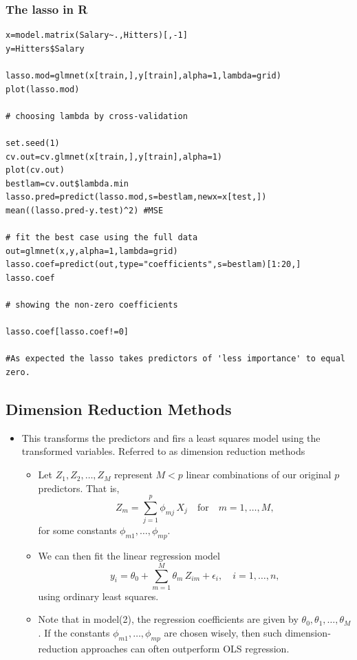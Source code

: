 \documentclass{article}
\begin{document}
\subsubsection{The lasso in R}
\begin{lstlisting}
x=model.matrix(Salary~.,Hitters)[,-1]
y=Hitters$Salary

lasso.mod=glmnet(x[train,],y[train],alpha=1,lambda=grid)
plot(lasso.mod)

# choosing lambda by cross-validation

set.seed(1)
cv.out=cv.glmnet(x[train,],y[train],alpha=1)
plot(cv.out)
bestlam=cv.out$lambda.min
lasso.pred=predict(lasso.mod,s=bestlam,newx=x[test,])
mean((lasso.pred-y.test)^2) #MSE

# fit the best case using the full data
out=glmnet(x,y,alpha=1,lambda=grid)
lasso.coef=predict(out,type="coefficients",s=bestlam)[1:20,]
lasso.coef

# showing the non-zero coefficients

lasso.coef[lasso.coef!=0]

#As expected the lasso takes predictors of 'less importance' to equal zero.
\end{lstlisting}


\subsection{Dimension Reduction Methods}
\begin{itemize}
    \item This transforms the predictors and firs a least squares model using the transformed variables. Referred to as dimension reduction methods
    \begin{itemize}
        \item Let \(Z_1, Z_2, \dots, Z_M\) represent \(M < p\) linear combinations of our original \(p\) predictors.  That is,
        \begin{equation*}
        Z_m = \sum_{j=1}^p \phi_{mj}\,X_j
        \quad\text{for}\quad m=1,\dots,M,
        \end{equation*}
    for some constants \(\phi_{m1},\dots,\phi_{mp}\).
    \item We can then fit the linear regression model
    \begin{equation*}
      y_i = \theta_0 + \sum_{m=1}^M \theta_m\,Z_{im} + \epsilon_i,
      \quad i = 1,\dots,n,
    \end{equation*}
    using ordinary least squares.
    \item Note that in model(2), the regression coefficients are given by \(\theta_0,\theta_1,\dots,\theta_M\).  If the constants \(\phi_{m1},\dots,\phi_{mp}\) are chosen wisely, then such dimension‐reduction approaches can often outperform OLS regression.
    \end{itemize}
\end{itemize}
\end{document}
